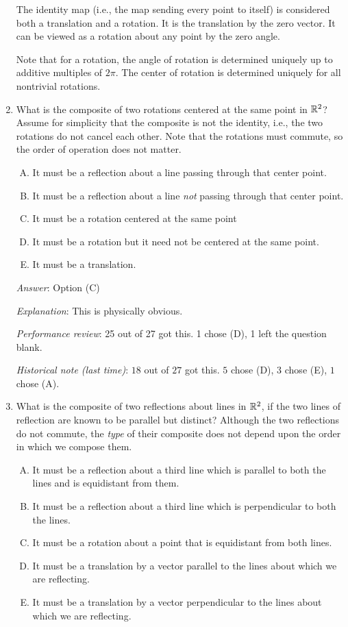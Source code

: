 \documentclass[10pt]{amsart}
\begin{document}
\begin{enumerate}
  The identity map (i.e., the map sending every point to itself) is
  considered both a translation and a rotation. It is the translation
  by the zero vector. It can be viewed as a rotation about any point
  by the zero angle.

  Note that for a rotation, the angle of rotation is determined
  uniquely up to additive multiples of $2\pi$. The center of rotation
  is determined uniquely for all nontrivial rotations.

 \item What is the composite of two rotations centered at the same
   point in $\mathbb{R}^2$? Assume for simplicity that the composite is not the
   identity, i.e., the two rotations do not cancel each other. Note
   that the rotations must commute, so the order of operation does
   not matter.

   \begin{enumerate}[(A)]
   \item It must be a reflection about a line passing through that center point.
   \item It must be a reflection about a line {\em not} passing through
     that center point.
   \item It must be a rotation centered at the same point
   \item It must be a rotation but it need not be centered at the same point.
   \item It must be a translation.
   \end{enumerate}

   {\em Answer}: Option (C)

   {\em Explanation}: This is physically obvious.

   {\em Performance review}: 25 out of 27 got this. 1 chose (D), 1
   left the question blank.

   {\em Historical note (last time)}: $18$ out of $27$ got this. $5$ chose (D),
   $3$ chose (E), $1$ chose (A).

 \item What is the composite of two reflections about lines in $\mathbb{R}^2$,
   if the two lines of reflection are known to be parallel but
   distinct? Although the two reflections do not commute, the {\em
     type} of their composite does not depend upon the order in which
   we compose them.

   \begin{enumerate}[(A)]
   \item It must be a reflection about a third line which is parallel
     to both the lines and is equidistant from them.
   \item It must be a reflection about a third line which is
     perpendicular to both the lines.
   \item It must be a rotation about a point that is equidistant from
     both lines.
   \item It must be a translation by a vector parallel to the lines
     about which we are reflecting.
   \item It must be a translation by a vector perpendicular to the
     lines about which we are reflecting.
   \end{enumerate}


\end{enumerate}
\end{document}
